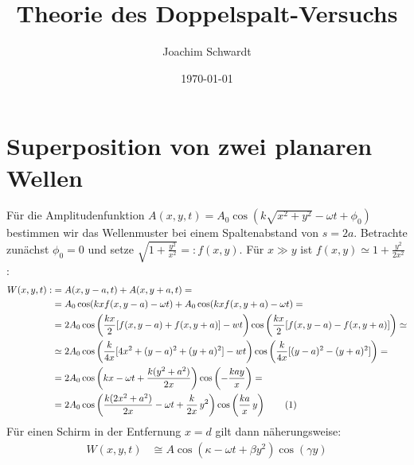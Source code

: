 \documentclass[a4paper,12pt]{article}
\newcommand\numberthis{\addtocounter{equation}{1}\tag{\theequation}}
\begin{document}
\title{Theorie des Doppelspalt-Versuchs}
\author{Joachim Schwardt}
\date{\today}
\maketitle

\section{Superposition von zwei planaren Wellen}
Für die Amplitudenfunktion $A(x, y, t)=A_0\cos(k\sqrt{x^2+y^2}-\omega t+\phi_0)$ bestimmen wir das Wellenmuster bei einem Spaltenabstand von $s=2a$. Betrachte zunächst $\phi_0=0$ und setze $\sqrt{1+\frac{y^2}{x^2}}=:f(x, y)$. Für $x\gg y$ ist $f(x, y)\simeq 1+\frac{y^2}{2x^2}$:  %
\begin{align*}
W(x, y, t):&=A(x, y-a, t)+A(x, y+a, t)= \\
&=A_0\cos(kxf(x, y-a)-\omega t)+A_0\cos(kxf(x, y+a)-\omega t)= \\
&=2A_0\cos\left(\frac{kx}{2}[f(x, y-a)+f(x, y+a)]-wt\right)\cos\left(\frac{kx}{2}[f(x, y-a)-f(x, y+a)] \right)\simeq \\
&\simeq 2A_0\cos\left(\frac{k}{4x}[4x^2+(y-a)^2+(y+a)^2]-wt\right)\cos\left(\frac{k}{4x}[(y-a)^2-(y+a)^2] \right)= \\
&=2A_0\cos\left(kx-\omega t+\frac{k(y^2+a^2)}{2x}\right)\cos\left(-\frac{kay}{x}  \right)= \\
&= 2A_0\cos\left(\frac{k(2x^2+a^2)}{2x}-\omega t+\frac{k}{2x}\, y^2\right)\cos\left(\frac{ka}{x}\, y\right) \numberthis\label{Wavefunction linear}
\end{align*}
Für einen Schirm in der Entfernung $x=d$ gilt dann näherungsweise:
\begin{align*}
W(x, y, t)&\cong A\cos(\kappa -\omega t+\beta y^2)\cos(\gamma y)
\end{align*}
\end{document}
